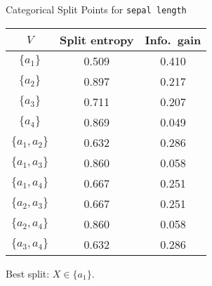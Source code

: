 \begin{frame}{Categorical Split Points for {\tt sepal length}}
\begin{center}
\renewcommand{\arraystretch}{1.1}
\begin{tabular}{|c|c|c|}
    \hline
    $V$ & Split entropy & Info.\ gain\\
    \hline
    $\{ a_1 \}$ & 0.509 & 0.410\\
    $\{ a_2 \}$ & 0.897 & 0.217\\
    $\{ a_3 \}$ & 0.711 & 0.207\\
    $\{ a_4 \}$ & 0.869 & 0.049\\
    $\{ a_1, a_2\}$ & 0.632 & 0.286\\
    $\{ a_1, a_3\}$ & 0.860 & 0.058\\
    $\{ a_1, a_4\}$ & 0.667 & 0.251\\
    $\{ a_2, a_3\}$ & 0.667 & 0.251\\
    $\{ a_2, a_4\}$ & 0.860 & 0.058\\
    $\{ a_3, a_4\}$ & 0.632 & 0.286\\
    \hline
    \end{tabular}%
\end{center}
Best split: $X \in \{a_1\}$.
\end{frame}
